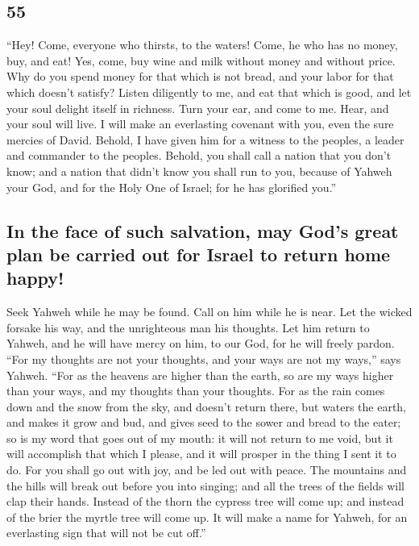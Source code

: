 \begin{paracol}{2}
\begin{otherlanguage}{english}
\hypertarget{section-109}{%
\section{55}\label{section-109}}

 ``Hey! Come, everyone who thirsts, to the waters! Come,
he who has no money, buy, and eat! Yes, come, buy wine and milk without
money and without price.  Why do you spend money for that
which is not bread, and your labor for that which doesn't satisfy?
Listen diligently to me, and eat that which is good, and let your soul
delight itself in richness.  Turn your ear, and come to
me. Hear, and your soul will live. I will make an everlasting covenant
with you, even the sure mercies of David.  Behold, I have
given him for a witness to the peoples, a leader and commander to the
peoples.  Behold, you shall call a nation that you don't
know; and a nation that didn't know you shall run to you, because of
Yahweh your God, and for the Holy One of Israel; for he has glorified
you.''

\hypertarget{in-the-face-of-such-salvation-may-gods-great-plan-be-carried-out-for-israel-to-return-home-happy}{%
\subsection{In the face of such salvation, may God's great plan be
carried out for Israel to return home
happy!}\label{in-the-face-of-such-salvation-may-gods-great-plan-be-carried-out-for-israel-to-return-home-happy}}

 Seek Yahweh while he may be found. Call on him while he
is near.  Let the wicked forsake his way, and the
unrighteous man his thoughts. Let him return to Yahweh, and he will have
mercy on him, to our God, for he will freely pardon. 
``For my thoughts are not your thoughts, and your ways are not my
ways,'' says Yahweh.  ``For as the heavens are higher than
the earth, so are my ways higher than your ways, and my thoughts than
your thoughts.  For as the rain comes down and the snow
from the sky, and doesn't return there, but waters the earth, and makes
it grow and bud, and gives seed to the sower and bread to the eater;
 so is my word that goes out of my mouth: it will not
return to me void, but it will accomplish that which I please, and it
will prosper in the thing I sent it to do.  For you shall
go out with joy, and be led out with peace. The mountains and the hills
will break out before you into singing; and all the trees of the fields
will clap their hands.  Instead of the thorn the cypress
tree will come up; and instead of the brier the myrtle tree will come
up. It will make a name for Yahweh, for an everlasting sign that will
not be cut off.''


\end{otherlanguage}
\end{paracol}
